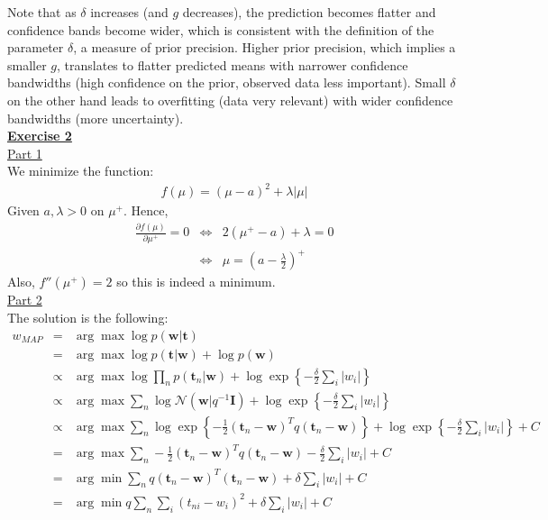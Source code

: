 \documentclass[a4paper, 11pt]{article}
\begin{document}
Note that as $\delta$ increases (and $g$ decreases), the prediction becomes flatter and confidence bands become wider, which is consistent with the definition of the parameter $\delta$, a measure of prior precision. Higher prior precision, which implies a smaller $g$, translates to flatter predicted means with narrower confidence bandwidths (high confidence on the prior, observed data less important). Small $\delta$ on the other hand leads to overfitting (data very relevant) with wider confidence bandwidths (more uncertainty).\\
\newpage
\textbf{\underline{Exercise 2}}\\
\newline \underline{Part 1}\\
\newline We minimize the function:
\begin{eqnarray}
f(\mu) = (\mu - a)^2 + \lambda |\mu| \nonumber
\end{eqnarray}
Given $a, \lambda > 0$ on $\mu^+$. Hence,
\begin{eqnarray}
\frac{\partial f(\mu)}{\partial \mu^+} = 0 &\Leftrightarrow& 2(\mu^+ -a) + \lambda = 0 \nonumber \\
&\Leftrightarrow& \mu = \left( a - \frac{\lambda}{2} \right)^+ \nonumber
\end{eqnarray}
Also, $f''(\mu^+) = 2$ so this is indeed a minimum.\\
\newline \underline{Part 2}\\
\newline The solution is the following:
\begin{eqnarray}
w_{MAP} &=& \arg \max \log p(\mathbf{w} |  \mathbf{t}) \nonumber \\
&=& \arg \max \log p(\mathbf{t} | \mathbf{w}) + \log p(\mathbf{w}) \nonumber \\
&\propto& \arg \max \log \prod_{n} p(\mathbf{t}_n | \mathbf{w}) + \log \exp \left\lbrace -\frac{\delta}{2} \sum_i |w_i|  \right\rbrace \nonumber \\
&\propto&  \arg \max \sum_{n} \log \mathcal{N}(\mathbf{w} | q^{-1} \mathbf{I}) + \log \exp \left\lbrace -\frac{\delta}{2} \sum_i |w_i|  \right\rbrace\nonumber \\
&\propto& \arg \max \sum_{n} \log \exp \left\lbrace -\frac{1}{2} (\mathbf{t}_n - \mathbf{w})^T q (\mathbf{t}_n - \mathbf{w}) \right\rbrace + \log \exp \left\lbrace -\frac{\delta}{2} \sum_i |w_i|  \right\rbrace + C \nonumber \\
&=& \arg \max \sum_{n} -\frac{1}{2} (\mathbf{t}_n - \mathbf{w})^T q (\mathbf{t}_n - \mathbf{w}) -\frac{\delta}{2} \sum_i |w_i| + C \nonumber \\
&=& \arg \min \sum_{n} q (\mathbf{t}_n - \mathbf{w})^T (\mathbf{t}_n - \mathbf{w}) + \delta \sum_i |w_i| + C \nonumber \\
&=& \arg \min q \sum_{n} \sum_{i} (t_{ni} - w_i)^2 + \delta \sum_i |w_i| + C \nonumber
\end{eqnarray}
\end{document}

